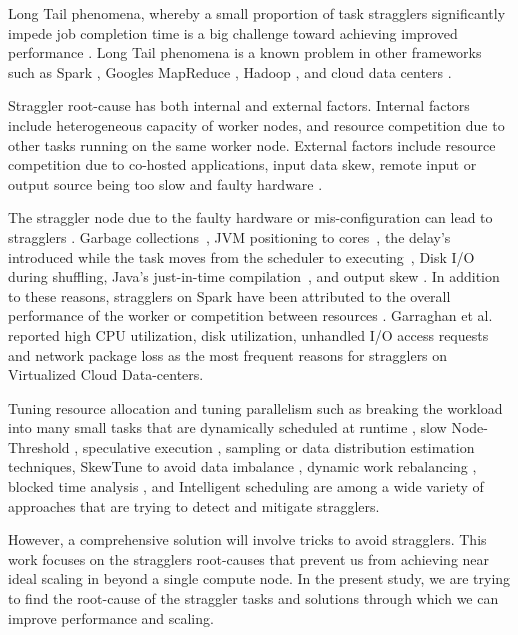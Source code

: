 \label{background}
Long Tail phenomena, whereby a small proportion of task stragglers significantly impede job completion time is a big challenge toward achieving improved performance \cite{Garraghan2016}.
Long Tail phenomena is a known problem in other frameworks such as Spark \cite{Kyong2017,Ousterhout2017,Gittens2016}, Google\textsc{}s MapReduce \cite{Dean2004}, Hadoop \cite{Dean2004}, and cloud data centers \cite{Schmidt2016}.

Straggler root-cause has both internal and external factors. 
Internal factors include heterogeneous capacity of worker nodes, and resource competition due to other tasks running on the same worker node. 
External factors include resource competition due to co-hosted applications, input data skew, remote input or output source being too slow and faulty hardware \cite{Chen2014}.

The straggler node due to the faulty hardware or mis-configuration can lead to stragglers \cite{Dean2004}. 
Garbage collections~\cite{Kyong2017,Ousterhout2017}, JVM positioning to cores~\cite{Kyong2017}, the delay's introduced while the task moves from the scheduler to executing~\cite{Gittens2016}, Disk I/O during shuffling, Java's just-in-time compilation~\cite{Ousterhout2017}, and output skew \cite{Ousterhout2017}. 
In addition to these reasons, stragglers on Spark have been attributed to the overall performance of the worker or competition between resources \cite{Yang2016}.
Garraghan et al. \cite{Garraghan2016} reported high CPU utilization, disk utilization, unhandled I/O access requests and network package loss as the most frequent reasons for stragglers on Virtualized Cloud Data-centers.

Tuning resource allocation and tuning parallelism such as breaking the workload into many small tasks that are dynamically scheduled at runtime \cite{Rosen2012}, slow Node-Threshold \cite{Dean2004}, speculative execution \cite{Dean2004}, sampling or data distribution estimation techniques, SkewTune to avoid data imbalance \cite{Kwon2012}, dynamic work rebalancing \cite{Schmidt2016}, blocked time analysis \cite{Ousterhout2015}, and Intelligent scheduling \cite{AWE-WQ2014} are among a wide variety of approaches that are trying to detect and mitigate stragglers. 

However, a comprehensive solution will involve tricks to avoid stragglers. 
This work focuses on the stragglers root-causes that prevent us from achieving near ideal scaling in  beyond a single compute node.
In the present study, we are trying to find the root-cause of the straggler tasks and solutions through which we can improve performance and scaling.
  

